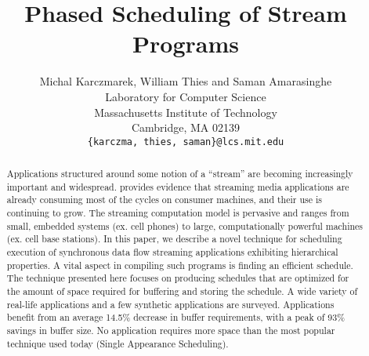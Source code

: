 \documentclass[runningheads,roman]{article}
\title{Phased Scheduling of Stream Programs}
\author{Michal Karczmarek, William Thies and Saman
Amarasinghe \\
Laboratory for Computer Science \\
        Massachusetts Institute of Technology \\
        Cambridge, MA  02139 \\
\texttt{\{karczma, thies, saman\}@lcs.mit.edu} \vspace{-24pt}}
\date{}
\begin{document}
\maketitle



\vspace{0.1in}

\begin{abstract}
Applications structured around some notion of a ``stream'' are
becoming increasingly important and widespread. \cite{Rix98}
provides evidence that streaming media applications are already
consuming most of the cycles on consumer machines, and their use
is continuing to grow. The streaming computation model is
pervasive and ranges from small, embedded systems (ex. cell
phones) to large, computationally powerful machines (ex. cell base
stations). In this paper, we describe a novel technique for
scheduling execution of synchronous data flow streaming
applications exhibiting hierarchical properties. A vital aspect in
compiling such programs is finding an efficient schedule. The
technique presented here focuses on producing schedules that are
optimized for the amount of space required for buffering and
storing the schedule. A wide variety of real-life applications and
a few synthetic applications are surveyed. Applications benefit
from an average 14.5\% decrease in buffer requirements, with a
peak of 93\% savings in buffer size. No application requires more
space than the most popular technique used today (Single
Appearance Scheduling).
\end{abstract}

%
%

%




%



%




\appendix


%
\end{document}
